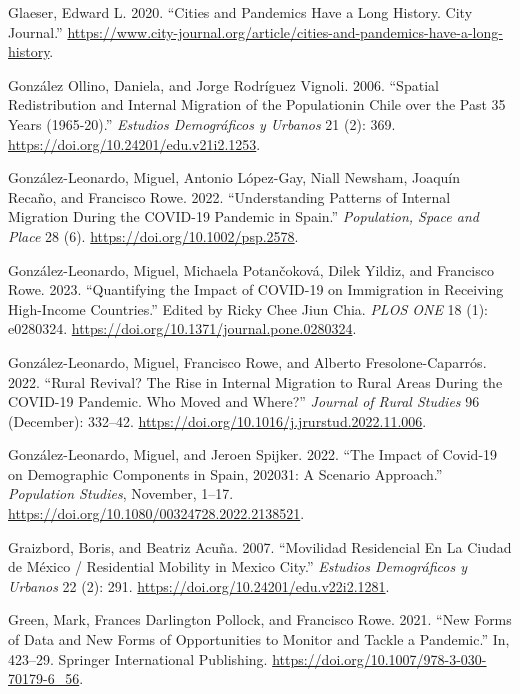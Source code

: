 \documentclass[11pt,letterpaper]{article}
\newlength{\cslhangindent}
\newlength{\cslentryspacingunit} %
\newenvironment{CSLReferences}[2] %
 {%
  \setlength{\parindent}{0pt}
  \ifodd #1
  \let\oldpar\par
  \def\par{\hangindent=\cslhangindent\oldpar}
  \fi
  \setlength{\parskip}{#2\cslentryspacingunit}
 }%
 {}
\begin{document}
\begin{CSLReferences}{1}{0}
\leavevmode{}%
Glaeser, Edward L. 2020. {``Cities and Pandemics Have a Long History.
City Journal.''}
\url{https://www.city-journal.org/article/cities-and-pandemics-have-a-long-history}.

\leavevmode{}%
González Ollino, Daniela, and Jorge Rodríguez Vignoli. 2006. {``Spatial
Redistribution and Internal Migration of the Populationin Chile over the
Past 35 Years (1965-20).''} \emph{Estudios Demográficos y Urbanos} 21
(2): 369. \url{https://doi.org/10.24201/edu.v21i2.1253}.

\leavevmode{}%
González-Leonardo, Miguel, Antonio López-Gay, Niall Newsham, Joaquín
Recaño, and Francisco Rowe. 2022. {``Understanding Patterns of Internal
Migration During the COVID{-}19 Pandemic in Spain.''} \emph{Population,
Space and Place} 28 (6). \url{https://doi.org/10.1002/psp.2578}.

\leavevmode{}%
González-Leonardo, Miguel, Michaela Potančoková, Dilek Yildiz, and
Francisco Rowe. 2023. {``Quantifying the Impact of COVID-19 on
Immigration in Receiving High-Income Countries.''} Edited by Ricky Chee
Jiun Chia. \emph{PLOS ONE} 18 (1): e0280324.
\url{https://doi.org/10.1371/journal.pone.0280324}.

\leavevmode{}%
González-Leonardo, Miguel, Francisco Rowe, and Alberto
Fresolone-Caparrós. 2022. {``Rural Revival? The Rise in Internal
Migration to Rural Areas During the COVID-19 Pandemic. Who Moved and
Where?''} \emph{Journal of Rural Studies} 96 (December): 332--42.
\url{https://doi.org/10.1016/j.jrurstud.2022.11.006}.

\leavevmode{}%
González-Leonardo, Miguel, and Jeroen Spijker. 2022. {``The Impact of
Covid-19 on Demographic Components in Spain, 2020{\textendash}31: A
Scenario Approach.''} \emph{Population Studies}, November, 1--17.
\url{https://doi.org/10.1080/00324728.2022.2138521}.

\leavevmode{}%
Graizbord, Boris, and Beatriz Acuña. 2007. {``Movilidad Residencial En
La Ciudad de México / Residential Mobility in Mexico City.''}
\emph{Estudios Demográficos y Urbanos} 22 (2): 291.
\url{https://doi.org/10.24201/edu.v22i2.1281}.

\leavevmode{}%
Green, Mark, Frances Darlington Pollock, and Francisco Rowe. 2021.
{``New Forms of Data and New Forms of Opportunities to Monitor and
Tackle a Pandemic.''} In, 423--29. Springer International Publishing.
\url{https://doi.org/10.1007/978-3-030-70179-6_56}.


\end{CSLReferences}
\end{document}

